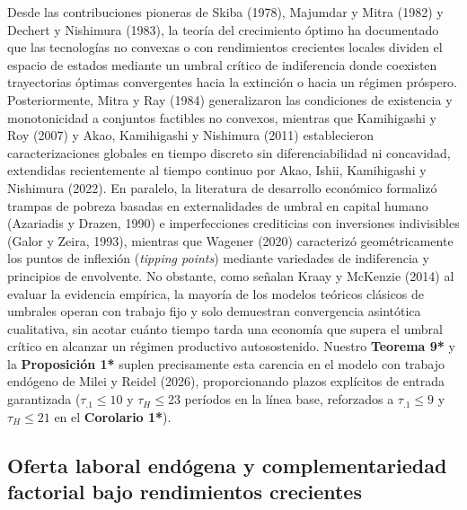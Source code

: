 \documentclass[11pt,letterpaper]{article}
\theoremstyle{plain}
\begin{document}
Desde las contribuciones pioneras de Skiba (1978), Majumdar y Mitra (1982) y Dechert y Nishimura (1983), la teoría del crecimiento óptimo ha documentado que las tecnologías no convexas o con rendimientos crecientes locales dividen el espacio de estados mediante un umbral crítico de indiferencia donde coexisten trayectorias óptimas convergentes hacia la extinción o hacia un régimen próspero. Posteriormente, Mitra y Ray (1984) generalizaron las condiciones de existencia y monotonicidad a conjuntos factibles no convexos, mientras que Kamihigashi y Roy (2007) y Akao, Kamihigashi y Nishimura (2011) establecieron caracterizaciones globales en tiempo discreto sin diferenciabilidad ni concavidad, extendidas recientemente al tiempo continuo por Akao, Ishii, Kamihigashi y Nishimura (2022). En paralelo, la literatura de desarrollo económico formalizó trampas de pobreza basadas en externalidades de umbral en capital humano (Azariadis y Drazen, 1990) e imperfecciones crediticias con inversiones indivisibles (Galor y Zeira, 1993), mientras que Wagener (2020) caracterizó geométricamente los puntos de inflexión (\emph{tipping points}) mediante variedades de indiferencia y principios de envolvente. No obstante, como señalan Kraay y McKenzie (2014) al evaluar la evidencia empírica, la mayoría de los modelos teóricos clásicos de umbrales operan con trabajo fijo y solo demuestran convergencia asintótica cualitativa, sin acotar cuánto tiempo tarda una economía que supera el umbral crítico en alcanzar un régimen productivo autosostenido. Nuestro \textbf{Teorema 9*} y la \textbf{Proposición 1*} suplen precisamente esta carencia en el modelo con trabajo endógeno de Milei y Reidel (2026), proporcionando plazos explícitos de entrada garantizada ($\tau_{.1}\le 10$ y $\tau_H\le 23$ períodos en la línea base, reforzados a $\tau_{.1}\le 9$ y $\tau_H\le 21$ en el \textbf{Corolario 1*}).

\subsection{Oferta laboral endógena y complementariedad factorial bajo rendimientos crecientes}
\end{document}
